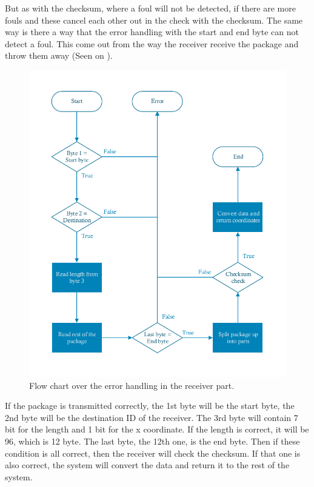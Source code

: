 But as with the checksum, where a foul will not be detected, if there are more fouls and these cancel each other out in the check with the checksum. The same way is there a way that the error handling with the start and end byte can not detect a foul. This come out from the way the receiver receive the package and throw them away (Seen on ).

\begin{figure}[H]
\centering
\includegraphics[scale=0.7]{figures/FlowReceiver.pdf}
\caption{Flow chart over the error handling in the receiver part.}
\label{FlowReceiver}
\end{figure}

If the package is transmitted correctly, the 1st byte will be the start byte, the 2nd byte will be the destination ID of the receiver. The 3rd byte will contain 7 bit for the length and 1 bit for the x coordinate. If the length is correct, it will be 96, which is 12 byte. The last byte, the 12th one, is the end byte. Then if these condition is all correct, then the receiver will check the checksum. If that one is also correct, the system will convert the data and return it to the rest of the system.

